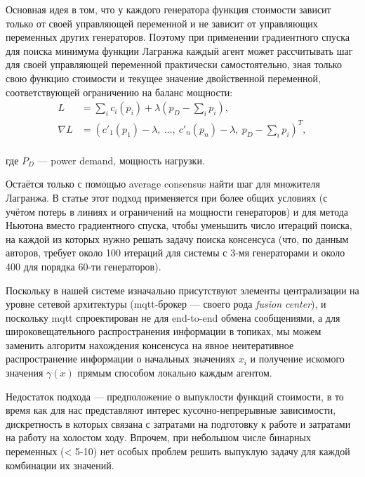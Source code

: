 \begin{itemize}
\begin{itemize}
Основная идея в том, что у каждого генератора функция стоимости зависит только от своей управляющей переменной и не зависит от управляющих переменных других генераторов.
Поэтому при применении градиентного спуска для поиска минимума функции Лагранжа каждый агент может рассчитывать шаг для своей управляющей переменной практически самостоятельно, зная только свою функцию стоимости и текущее значение двойственной переменной, соответствующей ограничению на баланс мощности:
\begin{equation}
\begin{split}
    L &= \sum_i c_i(p_i) + \lambda \left(p_D - \sum_i p_i \right),\\
    \nabla{L} &= 
    \left(
        {c'_1}(p_1) - \lambda,~
        \ldots,~ 
        c'_n(p_n) - \lambda,~
        p_D - \sum_i p_i 
    \right)^T,\\
\end{split}
\end{equation}

где $P_D$ --- power demand, мощность нагрузки. 

Остаётся только с помощью average consensus найти шаг для множителя Лагранжа. 
В статье этот подход применяется при более общих условиях (с учётом потерь в линиях и ограничений на мощности генераторов) и для метода Ньютона вместо градиентного спуска, чтобы уменьшить число итераций поиска, на каждой из которых нужно решать задачу поиска консенсуса (что, по данным авторов, требует около 100 итераций для системы с 3-мя генераторами и около 400 для порядка 60-ти генераторов).

\medskip

Поскольку в нашей системе изначально присутствуют элементы централизации на уровне сетевой архитектуры (mqtt-брокер --- своего рода \textit{fusion center}), и поскольку mqtt спроектирован не для end-to-end обмена сообщениями, а для широковещательного распространения информации в топиках, мы можем заменить алгоритм нахождения консенсуса на явное неитеративное распространение информации о начальных значениях $x_i$ и получение искомого значения $\gamma(x)$ прямым способом локально каждым агентом.

Недостаток подхода --- предположение о выпуклости функций стоимости, в то время как для нас представляют интерес кусочно-непрерывные зависимости, дискретность в которых связана с затратами на подготовку к работе и затратами на работу на холостом ходу. 
Впрочем, при небольшом числе бинарных переменных (< 5-10) нет особых проблем решить выпуклую задачу для каждой комбинации их значений.


\end{itemize}
\end{itemize}
